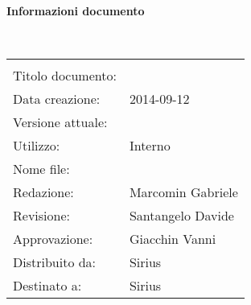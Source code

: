 \noindent\begin{Large}\textbf{Informazioni documento}\end{Large}\\
\begin{center}
\begin{tabular}{ll}
\hline\\
Titolo documento: & \doctitleVN{}\\
Data creazione: & 2014-09-12\\
Versione attuale: & \lastversionVN{}\\
Utilizzo: & Interno\\
Nome file:& \VerbaleN{}\\
Redazione: & Marcomin Gabriele\\
Revisione: & Santangelo Davide\\
Approvazione: & Giacchin Vanni\\
Distribuito da:& Sirius\\
Destinato a: & Sirius\\
\end{tabular}
\end{center}

